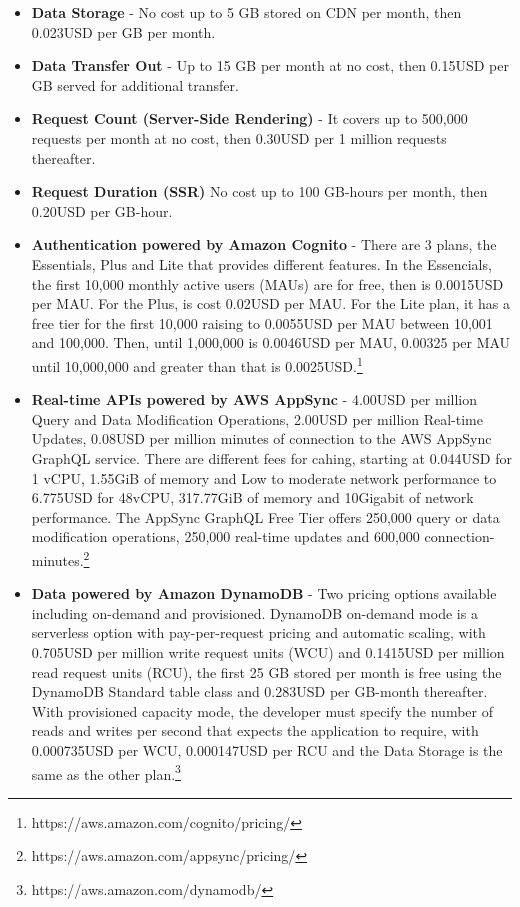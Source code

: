\begin{itemize}
	\item \textbf{Data Storage} - No cost up to 5 GB stored on CDN per month, then 0.023USD per GB per month.
	\item \textbf{Data Transfer Out} - Up to 15 GB per month at no cost, then 0.15USD per GB served for additional transfer.
	\item \textbf{Request Count (Server-Side Rendering)} - It covers up to 500,000 requests per month at no cost, then 0.30USD per 1 million requests thereafter.
	\item \textbf{Request Duration (SSR)} No cost up to 100 GB-hours per month, then 0.20USD per GB-hour.
	\item \textbf{Authentication powered by Amazon Cognito} - There are 3 plans, the Essentials, Plus and Lite that provides different features. In the Essencials, the first 10,000 monthly active users (MAUs) are for free, then is 0.0015USD per MAU. For the Plus, is cost 0.02USD per MAU. For the Lite plan, it has a free tier for the first 10,000 raising to 0.0055USD per MAU between 10,001 and 100,000. Then, until 1,000,000 is 0.0046USD per MAU, 0.00325 per MAU until 10,000,000 and greater than that is 0.0025USD.\footnote{https://aws.amazon.com/cognito/pricing/}
	\item \textbf{Real-time APIs powered by AWS AppSync} - 4.00USD per million Query and Data Modification Operations, 2.00USD per million Real-time Updates, 0.08USD per million minutes of connection to the AWS AppSync GraphQL service. There are different fees for cahing, starting at 0.044USD for 1 vCPU, 1.55GiB of memory and Low to moderate network performance to 6.775USD for 48vCPU, 317.77GiB of memory and 10Gigabit of network performance. The AppSync GraphQL Free Tier offers 250,000 query or data modification operations, 250,000 real-time updates and 600,000 connection-minutes.\footnote{https://aws.amazon.com/appsync/pricing/}
	\item \textbf{Data powered by Amazon DynamoDB} - Two pricing options available including on-demand and provisioned. DynamoDB on-demand mode is a serverless option with pay-per-request pricing and automatic scaling, with 0.705USD per million write request units (WCU) and 0.1415USD per million read request units (RCU), the first 25 GB stored per month is free using the DynamoDB Standard table class and 0.283USD per GB-month thereafter. With provisioned capacity mode, the developer must specify the number of reads and writes per second that expects the application to require, with 0.000735USD per WCU, 0.000147USD per RCU and the Data Storage is the same as the other plan.\footnote{https://aws.amazon.com/dynamodb/}

\end{itemize}
